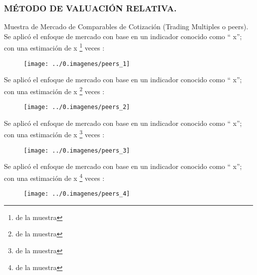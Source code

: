 \subsubsection{M\'ETODO DE VALUACI\'ON RELATIVA.}

\textcolor{principal}{Muestra de Mercado de Comparables de Cotizaci\'on (Trading Multiples o \gls{peers})}. Se aplic\'o el enfoque de mercado con base en un indicador conocido como ``\textcolor{principal}{\peersa} x''; con una estimaci\'on de \textcolor{principal}{\peersaMult x} \footnote{\peersaEst{} de la muestra} veces \peersaTo:\\



\begin{figure}[H]
\centering
\texttt{[image: ../0.imagenes/peers\_1]}
\end{figure}

\newpage
Se aplic\'o el enfoque de mercado con base en un indicador conocido como ``\textcolor{principal}{\peersb} x''; con una estimaci\'on de \textcolor{principal}{\peersbMult x} \footnote{\peersbEst{} de la muestra} veces \peersbTo:\\

\begin{figure}[H]
\centering
\texttt{[image: ../0.imagenes/peers\_2]}
\end{figure}

\newpage

Se aplic\'o el enfoque de mercado con base en un indicador conocido como ``\textcolor{principal}{\peersc} x''; con una estimaci\'on de \textcolor{principal}{\peerscMult x} \footnote{\peerscEst{} de la muestra} veces \peerscTo:\\

\begin{figure}[H]
\centering
\texttt{[image: ../0.imagenes/peers\_3]}
\end{figure}

\newpage

Se aplic\'o el enfoque de mercado con base en un indicador conocido como ``\textcolor{principal}{\peersd} x''; con una estimaci\'on de \textcolor{principal}{\peersdMult x} \footnote{\peersdEst{} de la muestra} veces \peersdTo:\\

\begin{figure}[H]
\centering
\texttt{[image: ../0.imagenes/peers\_4]}
\end{figure}

